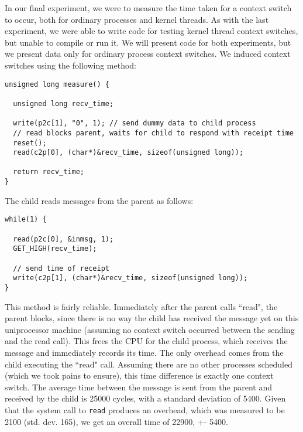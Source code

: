 In our final experiment, we were to measure the time taken for a context switch to occur, both for ordinary processes and kernel threads. As with the last experiment, we were able to write code for testing kernel thread context switches, but unable to compile or run it. We will present code for both experiments, but we present data only for ordinary process context switches.
\newline
\newline
We induced context switches using the following method:

\noindent \begin{verbatim}
unsigned long measure() {

  unsigned long recv_time;

  write(p2c[1], "0", 1); // send dummy data to child process
  // read blocks parent, waits for child to respond with receipt time
  reset();
  read(c2p[0], (char*)&recv_time, sizeof(unsigned long)); 
  
  return recv_time;
}
\end{verbatim}

\noindent The child reads messages from the parent as follows:

\noindent \begin{verbatim}
while(1) {

  read(p2c[0], &inmsg, 1);
  GET_HIGH(recv_time);
  
  // send time of receipt
  write(c2p[1], (char*)&recv_time, sizeof(unsigned long));
}
\end{verbatim}

\noindent This method is fairly reliable. Immediately after the parent calls ``read", the parent blocks, since there is no way the child has received the message yet on this uniprocessor machine (assuming no context switch occurred between the sending and the read call). This frees the CPU for the child process, which receives the message and immediately records its time. The only overhead comes from the child executing the ``read" call. Assuming there are no other processes scheduled (which we took pains to ensure), this time difference is exactly one context switch.
\newline
\newline
The average time between the message is sent from the parent and received by the child is 25000 cycles, with a standard deviation of 5400. Given that the system call to {\tt read} produces an overhead, which was measured to be 2100 (std. dev. 165), we get an overall time of 22900, +- 5400.

